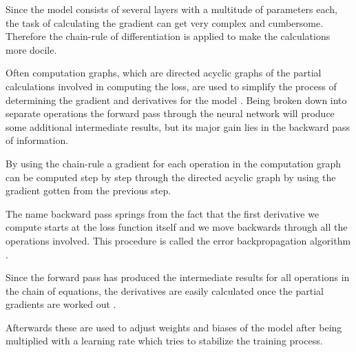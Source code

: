 Since the model consists of several layers with a multitude of parameters each, the task of calculating the gradient can get very complex and cumbersome. 
Therefore the chain-rule of differentiation is applied to make the calculations more docile.

Often computation graphs, which are directed acyclic graphs of the partial calculations involved in computing the loss, are used to simplify the process of determining the gradient and derivatives for the model \citep{goldberg2017neural}.
Being broken down into separate operations the forward pass through the neural network will produce some additional intermediate results, but its major gain lies in the backward pass of information.

By using the chain-rule a gradient for each operation in the computation graph can be computed step by step through the directed acyclic graph by using the gradient gotten from the previous step.

The name backward pass springs from the fact that the first derivative we compute starts at the loss function itself and we move backwards through all the operations involved. This procedure is called the error backpropagation algorithm \citep{jurafsky2021}.

Since the forward pass has produced the intermediate results for all operations in the chain of equations, the derivatives are easily calculated once the partial gradients are worked out \citep{jurafsky2021}.

Afterwards these are used to adjust weights and biases of the model after being multiplied with a learning rate which tries to stabilize the training process.


